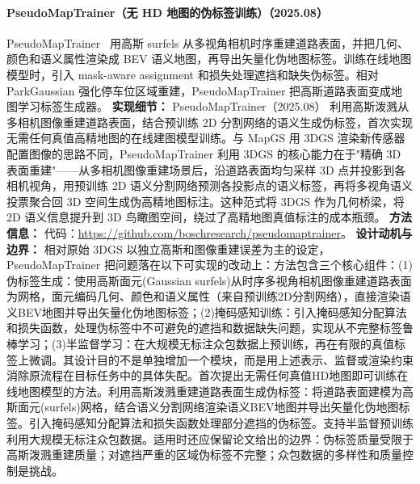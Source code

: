 \paragraph{PseudoMapTrainer（无 HD 地图的伪标签训练）（2025.08）}
PseudoMapTrainer~\cite{2508_18788} 用高斯 surfels 从多视角相机时序重建道路表面，并把几何、颜色和语义属性渲染成 BEV 语义地图，再导出矢量化伪地图标签。训练在线地图模型时，引入 mask-aware assignment 和损失处理遮挡和缺失伪标签。相对 ParkGaussian 强化停车位区域重建，PseudoMapTrainer 把高斯道路表面变成地图学习标签生成器。
\textbf{实现细节：} PseudoMapTrainer（2025.08） 利用高斯泼溅从多相机图像重建道路表面，结合预训练 2D 分割网络的语义生成伪标签，首次实现无需任何真值高精地图的在线建图模型训练。与 MapGS 用 3DGS 渲染新传感器配置图像的思路不同，PseudoMapTrainer 利用 3DGS 的核心能力在于"精确 3D 表面重建"——从多相机图像重建场景后，沿道路表面均匀采样 3D 点并投影到各相机视角，用预训练 2D 语义分割网络预测各投影点的语义标签，再将多视角语义投票聚合回 3D 空间生成伪高精地图标注。这种范式将 3DGS 作为几何桥梁，将 2D 语义信息提升到 3D 鸟瞰图空间，绕过了高精地图真值标注的成本瓶颈。
\textbf{方法信息：} 代码：\url{https://github.com/boschresearch/pseudomaptrainer}。
\textbf{设计动机与边界：} 相对原始 3DGS 以独立高斯和图像重建误差为主的设定，PseudoMapTrainer 把问题落在以下可实现的改动上：方法包含三个核心组件：(1)伪标签生成：使用高斯面元(Gaussian surfels)从时序多视角相机图像重建道路表面为网格，面元编码几何、颜色和语义属性（来自预训练2D分割网络），直接渲染语义BEV地图并导出矢量化伪地图标签；(2)掩码感知训练：引入掩码感知分配算法和损失函数，处理伪标签中不可避免的遮挡和数据缺失问题，实现从不完整标签鲁棒学习；(3)半监督学习：在大规模无标注众包数据上预训练，再在有限的真值标签上微调。其设计目的不是单独增加一个模块，而是用上述表示、监督或渲染约束消除原流程在目标任务中的具体失配。首次提出无需任何真值HD地图即可训练在线地图模型的方法。利用高斯泼溅重建道路表面生成伪标签：将道路表面建模为高斯面元(surfels)网格，结合语义分割网络渲染语义BEV地图并导出矢量化伪地图标签。引入掩码感知分配算法和损失函数处理部分遮挡的伪标签。支持半监督预训练利用大规模无标注众包数据。适用时还应保留论文给出的边界：伪标签质量受限于高斯泼溅重建质量；对遮挡严重的区域伪标签不完整；众包数据的多样性和质量控制是挑战。
